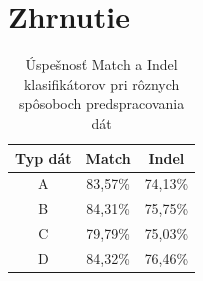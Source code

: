 

\section{Zhrnutie}


\todo

\begin{table}[htp]
\centering
\begin{tabular}{c|cc}
Typ dát & Match & Indel\\
\hline
A & 83,57\% & 74,13\%\\
B & 84,31\% & 75,75\%\\
C & 79,79\% & 75,03\%\\
D & 84,32\% & 76,46\%\\
\end{tabular}
\caption[Úspešnosť klasifikátorov pri rôznych typoch dát]{Úspešnosť Match a Indel klasifikátorov pri rôznych spôsoboch predspracovania dát}
\label{tab:datatype-all}
\end{table}

